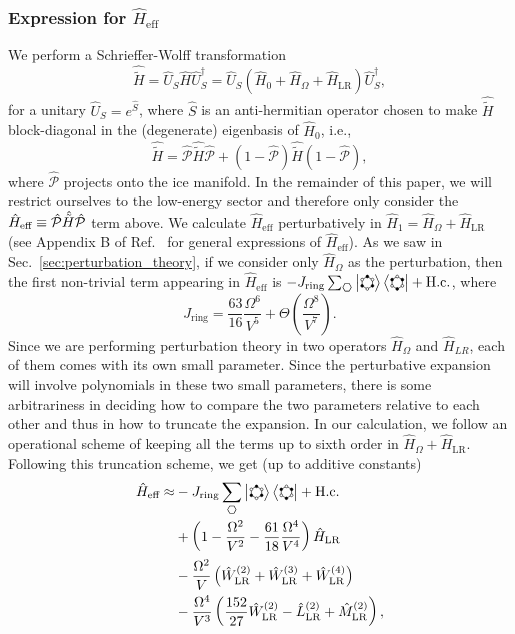 \documentclass[twocolumn,superscriptaddress,amsmath,amssymb,aps,prx,nofootinbib]{revtex4-2}
\newcommand{\hexA}{\hspace{-0.1cm}\raisebox{-0.1cm}{
\begin{tikzpicture}
    \newdimen\r
    \newdimen\rad
    \r = 0.15cm
    \rad = 1pt
    \draw[rotate=30] (-0.15cm:\r) \foreach \x in {60,120,...,360} {  -- (\x:\r) };
   \foreach \x in {-30,90,210} { \filldraw [black] (\x:\r)  circle (\rad);}
   \foreach \x in {30,150,270} { \filldraw [draw=black,fill=white] (\x:\r)  circle (\rad);}
\end{tikzpicture}}
}
\newcommand{\hexB}{\hspace{-0.1cm}\raisebox{-0.1cm}{
\begin{tikzpicture}
    \newdimen\r
    \newdimen\rad
    \r = 0.15cm
    \rad = 1pt
   \draw[rotate=30] (0:\r) \foreach \x in {60,120,...,360} {  -- (\x:\r) };
   \foreach \x in {30,150,270} { \filldraw [black] (\x:\r)  circle (\rad);}
   \foreach \x in {-30,90,210} { \filldraw [draw=black,fill=white] (\x:\r)  circle (\rad);}
\end{tikzpicture}}
}
\begin{document}
\subsubsection{Expression for $\hat{H}_{\text{eff}}$} \label{sec:expression_for_Heff}
We perform a Schrieffer-Wolff transformation 
\begin{equation}\label{eq:scwtrans}
    \hat{\tilde{H}}= \hat{U}_S \hat{H} \hat{U}_S^{\dagger} = \hat{U}_S \left(\hat{H}_0 + \hat{H}_\Omega + \hat{H}_{\text{LR}}\right)\hat{U}_S^{\dagger},
\end{equation}
for a unitary $\hat{U}_S=e^{\hat{S}}$, where $\hat{S}$ is an anti-hermitian operator  
chosen to make $\hat{\tilde{H}}$ block-diagonal in the (degenerate) eigenbasis of $\hat{H}_0$, i.e.,~
\begin{equation}\label{eq:effhamdef}
\hat{\tilde{H}}=\hat{\mathcal{P}}\hat{\tilde{H}}\hat{\mathcal{P}} + (1-\hat{\mathcal{P}})\hat{\tilde{H}}(1-\hat{\mathcal{P}}), 
\end{equation}
where $\hat{\mathcal{P}}$ projects onto the ice manifold. In the remainder of this paper, we will restrict ourselves to the low-energy sector and therefore only consider the $\hat{H}_{\text{eff}} \equiv\hat{\mathcal{P}}\hat{\Tilde{H}}\hat{\mathcal{P}}$ term above. We calculate $\hat{H}_{\text{eff}}$ perturbatively in $\hat{H}_1 = \hat{H}_\Omega +\hat{H}_{\text{LR}}$ (see Appendix B of Ref.~\cite{slagle2017} for general expressions of $\hat{H}_\text{eff}$). As we saw in Sec.~\ref{sec:perturbation_theory}, if we consider only $\hat{H}_\Omega$ as the perturbation, then the first non-trivial term appearing in $\hat{H}_{\text{eff}}$ is $ -J_{\text{ring}} \sum_{\hexagon} \ket{\hexA}\bra{\hexB} + \text{H.c.}$, where 
\begin{equation}
  J_{\text{ring}}= \frac{63}{16}\frac{\Omega^6}{V^5} + \Theta\left( \frac{\Omega^8}{V^7} \right).
\end{equation} 
Since we are performing perturbation theory in two operators $\hat{H}_{\Omega}$ and $\hat{H}_{LR}$, each of them comes with its own small parameter. Since the perturbative expansion will involve polynomials in these two small parameters, there is some arbitrariness in deciding how to compare the two parameters relative to each other and thus in how to truncate the expansion. In our calculation, we follow an operational scheme of keeping all the terms up to sixth order in $\hat{H}_\Omega+\hat{H}_{\text{LR}}$. Following this truncation scheme, we get (up to additive constants)
\begin{equation}\label{eq:Hpertlr}
\begin{aligned}
     \hat{H}_{\text{eff}}\approx&-J_{\text{ring}} \sum_{\hexagon} \ket{\hexA}\bra{\hexB} + \text{H.c.}\\
     &+\left(1-\frac{\Omega^2}{V^2}-\frac{61}{18}\frac{\Omega^4}{V^4}\right)\hat{H}_{\text{LR}}\\& - \frac{\Omega^2}{V}\left( \hat{W}^{(2)}_{\text{LR}}+\hat{W}^{(3)}_{\text{LR}}+\hat{W}^{(4)}_{\text{LR}}\right)\\
     &-\frac{\Omega^4}{V^3}\left(\frac{152}{27} \hat{W}^{(2)}_{\text{LR}}-\hat{L}^{(2)}_{\text{LR}}+\hat{M}^{(2)}_{\text{LR}}\right),
\end{aligned}
\end{equation}
\end{document}
